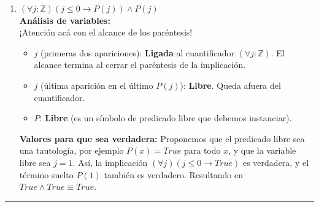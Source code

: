 \begin{enumerate}[label=\textbf{\alph*)}]
    \vspace{0.4cm}
    \item \textbf{$(\forall j: \mathbb{Z}) (j \leq 0 \rightarrow P(j)) \wedge P(j)$} \\
    \textbf{Análisis de variables:} \\
    ¡Atención acá con el alcance de los paréntesis!
    \begin{itemize}
        \item $j$ (primeras dos apariciones): \textbf{Ligada} al cuantificador $(\forall j: \mathbb{Z})$. El alcance termina al cerrar el paréntesis de la implicación.
        \item $j$ (última aparición en el último $P(j)$): \textbf{Libre}. Queda afuera del cuantificador.
        \item $P$: \textbf{Libre} (es un símbolo de predicado libre que debemos instanciar).
    \end{itemize}
    \textbf{Valores para que sea verdadera:} Proponemos que el predicado libre sea una tautología, por ejemplo $P(x) = True$ para todo $x$, y que la variable libre sea $j = 1$. Así, la implicación $(\forall j) (j \leq 0 \rightarrow True)$ es verdadera, y el término suelto $P(1)$ también es verdadero. Resultando en $True \wedge True \equiv True$.

\end{enumerate}

\vspace{0.5cm}
\hrule
\vspace{0.5cm}
